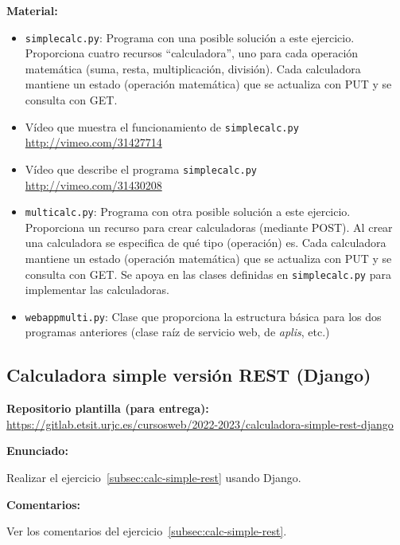 \textbf{Material:}

\begin{itemize}
\item \texttt{simplecalc.py}: Programa con una posible solución a este ejercicio. Proporciona cuatro recursos ``calculadora'', uno para cada operación matemática (suma, resta, multiplicación, división). Cada calculadora mantiene un estado (operación matemática) que se actualiza con PUT y se consulta con GET.
\item Vídeo que muestra el funcionamiento de \texttt{simplecalc.py} \\
  \url{http://vimeo.com/31427714}
\item Vídeo que describe el programa \texttt{simplecalc.py} \\
  \url{http://vimeo.com/31430208}
\item \texttt{multicalc.py}: Programa con otra posible solución a este ejercicio. Proporciona un recurso para crear calculadoras (mediante POST). Al crear una calculadora se especifica de qué tipo (operación) es. Cada calculadora mantiene un estado (operación matemática) que se actualiza con PUT y se consulta con GET. Se apoya en las clases definidas en \texttt{simplecalc.py} para implementar las calculadoras.
\item \texttt{webappmulti.py}: Clase que proporciona la estructura básica para los dos programas anteriores (clase raíz de servicio web, de \emph{aplis}, etc.)
\end{itemize}

\subsection{Calculadora simple versión REST (Django)}
\label{subsec:calc-simple-rest-django}

\textbf{Repositorio plantilla (para entrega):} \\
\url{https://gitlab.etsit.urjc.es/cursosweb/2022-2023/calculadora-simple-rest-django}

\textbf{Enunciado:}

Realizar el ejercicio~\ref{subsec:calc-simple-rest} usando Django.

\textbf{Comentarios:}

Ver los comentarios del ejercicio~\ref{subsec:calc-simple-rest}.

